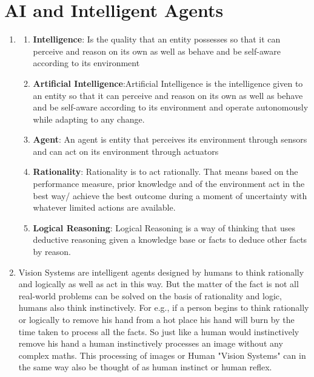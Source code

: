 \documentclass[12pt,letterpaper]{article}
\begin{document}
\section*{AI and Intelligent Agents}
\begin{enumerate}
    \item
        \begin{enumerate}
            \item \textbf{Intelligence}: Is the quality that an entity possesses so that it can perceive and reason on its own as well as behave and be self-aware according to its environment
            \item \textbf{Artificial Intelligence}:Artificial Intelligence is the intelligence given to an entity so that it can perceive and reason on its own as well as behave and be self-aware according to its environment and operate autonomously while adapting to any change.
            \item \textbf{Agent}: An agent is entity that perceives its environment through sensors and can act on its environment through actuators
            \item \textbf{Rationality}: Rationality is to act rationally. That means based on the performance measure, prior knowledge and of the environment act in the best way/ achieve the best outcome during a moment of uncertainty with whatever limited actions are available. 
            \item \textbf{Logical Reasoning}: Logical Reasoning is a way of thinking that uses deductive reasoning given a knowledge base or facts to deduce other facts by reason.
        \end{enumerate}
    \item Vision Systems are intelligent agents designed by humans to think rationally and logically as well as act in this way. But the matter of the fact is not all real-world problems can be solved on the basis of rationality and logic, humans also think instinctively. For e.g., if a person begins to think rationally or logically to remove his hand from a hot place his hand will burn by the time taken to process all the facts. So just like a human would instinctively remove his hand a human instinctively processes an image without any complex maths. This processing of images or Human "Vision Systems" can in the same way also be thought of as human instinct or human reflex. \\
    

\end{enumerate}
\end{document}
